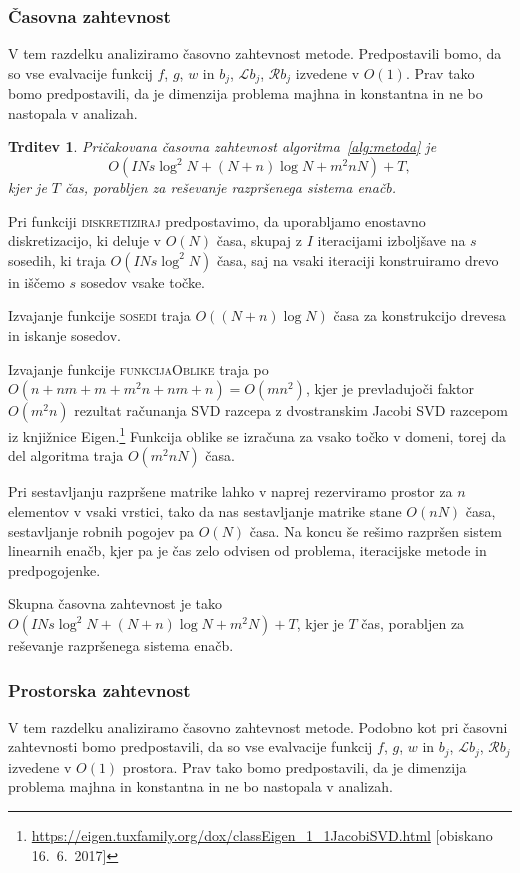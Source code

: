 \documentclass[12pt,a4paper]{article}
\theoremstyle{definition} %
\theoremstyle{plain} %
\newtheorem{trditev}[definicija]{Trditev}
\numberwithin{equation}{section}
\newcommand{\Rc}{\mathcal{R}}
\renewcommand{\L}{\mathcal{L}}
\begin{document}
\subsubsection{Časovna zahtevnost}
V tem razdelku analiziramo časovno zahtevnost metode. Predpostavili bomo, da so
vse evalvacije funkcij $f$, $g$, $w$ in $b_j$, $\L b_j$, $\Rc b_j$ izvedene v $O(1)$.
Prav tako bomo predpostavili, da je dimenzija problema majhna in konstantna in
ne bo nastopala v analizah.

\begin{trditev}
  Pričakovana časovna zahtevnost algoritma~\ref{alg:metoda} je
  \[ O(I N s \log^2 N + (N+n)\log N + m^2n N) + T,\] kjer je $T$ čas,
  porabljen za reševanje razpršenega sistema enačb.
\end{trditev}
\proof
Pri funkciji \textsc{diskretiziraj} predpostavimo, da uporabljamo enostavno
diskretizacijo, ki deluje v $O(N)$ časa, skupaj z $I$ iteracijami izboljšave
na $s$ sosedih, ki traja $O(I N s \log^2 N)$ časa, saj na vsaki iteraciji
konstruiramo drevo in iščemo $s$ sosedov vsake točke.

Izvajanje funkcije \textsc{sosedi} traja $O((N+n) \log N)$ časa za konstrukcijo
drevesa in iskanje sosedov.

Izvajanje funkcije \textsc{funkcijaOblike} traja po $O(n + nm + m + m^2n + nm +
n) = O(mn^2)$, kjer je prevladujoči faktor $O(m^2 n)$ rezultat računanja SVD
razcepa z dvostranskim Jacobi SVD razcepom iz knjižnice
Eigen.\footnote{\url{https://eigen.tuxfamily.org/dox/classEigen_1_1JacobiSVD.html}
[obiskano 16.\ 6.\ 2017]} Funkcija oblike se izračuna za vsako točko v domeni,
torej da del algoritma traja $O(m^2 n N)$ časa.

Pri sestavljanju razpršene matrike lahko v naprej rezerviramo prostor za $n$
elementov v vsaki vrstici, tako da nas sestavljanje matrike stane $O(nN)$ časa,
sestavljanje robnih pogojev pa $O(N)$ časa. Na koncu še rešimo razpršen sistem
linearnih enačb, kjer pa je čas zelo odvisen od problema, iteracijske metode in
predpogojenke.

Skupna časovna zahtevnost je tako $O(I N s \log^2 N + (N+n)\log N + m^2 N) + T$,
kjer je $T$ čas, porabljen za reševanje razpršenega sistema enačb.
\endproof

\subsubsection{Prostorska zahtevnost}
V tem razdelku analiziramo časovno zahtevnost metode. Podobno kot pri časovni
zahtevnosti bomo predpostavili, da so
vse evalvacije funkcij $f$, $g$, $w$ in $b_j$, $\L b_j$, $\Rc b_j$ izvedene v
$O(1)$ prostora.
Prav tako bomo predpostavili, da je dimenzija problema majhna in konstantna in
ne bo nastopala v analizah.
\end{document}
